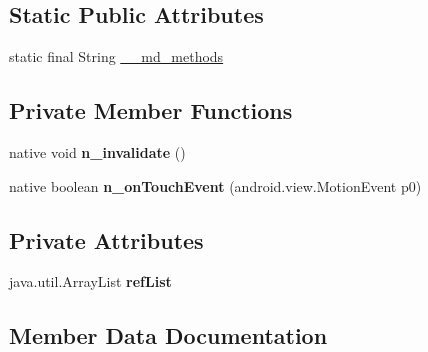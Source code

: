\subsection*{Static Public Attributes}
\begin{DoxyCompactItemize}
\item 
static final String \hyperlink{classmd57018357d52b54713cd814fbd5262dd1f_1_1ImageRenderer_a8e8d2f260d749e2e0e874ea565fa7dd1}{\+\_\+\+\_\+md\+\_\+methods}
\end{DoxyCompactItemize}
\subsection*{Private Member Functions}
\begin{DoxyCompactItemize}
\item 
\mbox{\label{classmd57018357d52b54713cd814fbd5262dd1f_1_1ImageRenderer_a5f202a7e86ff8e17c3eff23fa28e3abd}} 
native void {\bfseries n\+\_\+invalidate} ()
\item 
\mbox{\label{classmd57018357d52b54713cd814fbd5262dd1f_1_1ImageRenderer_ab3a8104db2421034514e859324e37932}} 
native boolean {\bfseries n\+\_\+on\+Touch\+Event} (android.\+view.\+Motion\+Event p0)
\end{DoxyCompactItemize}
\subsection*{Private Attributes}
\begin{DoxyCompactItemize}
\item 
\mbox{\label{classmd57018357d52b54713cd814fbd5262dd1f_1_1ImageRenderer_aa8958605027a4bc0fadeb74bef6e6aef}} 
java.\+util.\+Array\+List {\bfseries ref\+List}
\end{DoxyCompactItemize}


\subsection{Member Data Documentation}
\mbox{\label{classmd57018357d52b54713cd814fbd5262dd1f_1_1ImageRenderer_a8e8d2f260d749e2e0e874ea565fa7dd1}} 
